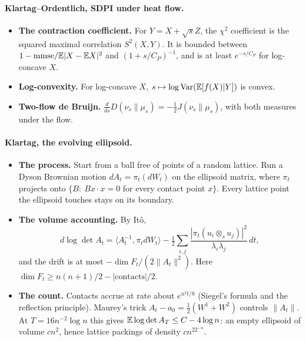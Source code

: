 \paragraph{Klartag--Ordentlich, SDPI under heat flow.}
\begin{itemize}[leftmargin=*]
\item \textbf{The contraction coefficient.} For $Y=X+\sqrt sZ$, the $\chi^2$ coefficient is the squared maximal correlation $S^2(X,Y)$.
It is bounded between $1-\mathrm{mmse}/\mathbb E|X-\mathbb E X|^2$ and $(1+s/C_P)^{-1}$, and is at least $e^{-s/C_P}$ for log-concave $X$.
\item \textbf{Log-convexity.} For log-concave $X$, $s\mapsto\log\operatorname{Var}(\mathbb E[f(X)|Y])$ is convex.
\item \textbf{Two-flow de Bruijn.} $\frac d{ds}D(\nu_s\|\mu_s)=-\frac12J(\nu_s\|\mu_s)$, with both measures under the flow.
\end{itemize}

\paragraph{Klartag, the evolving ellipsoid.}
\begin{itemize}[leftmargin=*]
\item \textbf{The process.} Start from a ball free of points of a random lattice. Run a Dyson Brownian motion $dA_t=\pi_t(dW_t)$ on
the ellipsoid matrix, where $\pi_t$ projects onto $\{B:\ Bx\cdot x=0$ for every contact point $x\}$. Every lattice point the
ellipsoid touches stays on its boundary.
\item \textbf{The volume accounting.} By It\^o,
\[
d\log\det A_t=\langle A_t^{-1},\pi_tdW_t\rangle-\tfrac12\sum_{i,j}\frac{|\pi_t(u_i\otimes_su_j)|^2}{\lambda_i\lambda_j}\,dt,
\]
and the drift is at most $-\dim F_t/(2\|A_t\|^2)$. Here $\dim F_t\ge n(n+1)/2-|\text{contacts}|/2$.
\item \textbf{The count.} Contacts accrue at rate about $e^{n^2t/8}$ (Siegel's formula and the reflection principle). Maurey's
trick $A_t-a_0=\frac12(W^1+W^2)$ controls $\|A_t\|$. At $T=16n^{-2}\log n$ this gives $\mathbb E\log\det A_T\le C-4\log n$: an empty
ellipsoid of volume $cn^2$, hence lattice packings of density $cn^22^{-n}$.
\end{itemize}

